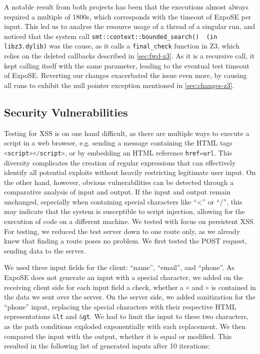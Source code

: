A notable result from both projects has been that the executions almost always required a multiple of 1800s, which corresponds with the timeout of ExpoSE per input.
This led us to analyse the resource usage of a thread of a singular run, and noticed that the system call \lstinline{smt::context::bounded_search()  (in libz3.dylib)} was the cause, as it calls a \lstinline{final_check} function in Z3, which relies on the deleted callbacks described in \autoref{sec:fwd-z3}. As it is a recursive call, it kept calling itself with the same parameter, leading to the eventual test timeout of ExpoSE.  Reverting our changes exacerbated the issue even more, by causing all runs to exhibit the null pointer exception mentioned in \autoref{sec:changes-z3}.

\subsection{Security Vulnerabilities}
Testing for XSS is on one hand difficult, as there are multiple ways to execute a script in a web browser,
e.g. sending a message containing the HTML tags \lstinline[language=JavaScript]{<script></script>}, 
or by embedding an HTML reference \lstinline[language=JavaScript]{href=url}. 
This diversity complicates the creation of regular expressions that can effectively identify 
all potential exploits without heavily restricting legitimate user input.
On the other hand, however, obvious vulnerabilities can be detected through a comparative analysis of input and output.
If the input and output remain unchanged, especially when containing special characters like “\textless” or “/”, this may indicate that the system is susceptible to script injection, allowing for the execution of code on a different machine. 
We tested with focus on persistent XSS. For testing, we reduced the test server down to one route only, as we already knew that finding a route poses no problem. 
We first tested the \textsc{POST} request, sending data to the server.

We used three input fields for the client: “name”, “email”, and “phone”.
As ExpoSE does not generate an input with a special character, we added on the receiving client side for each input field a check, whether a \lstinline[language=JavaScript]{<} and \lstinline[language=JavaScript]{>} is contained in the data we sent over the server. On the server side, we added sanitization for the “phone” input, replacing the special characters with their respective HTML representations \lstinline[language=JavaScript]+&lt+
and \lstinline[language=JavaScript]+&gt+. We had to limit the input to these two characters, as the path conditions exploded exponentially with each replacement. We then compared the input with the output, whether it is equal or modified.
\newpage
This resulted in the following list of generated inputs after 10 iterations:

